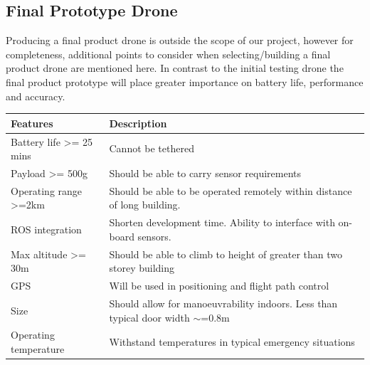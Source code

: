 \documentclass[capstone_report.tex]{subfiles}
\begin{document}
\subsection{Final Prototype Drone}
Producing a final product drone is outside the scope of our project, however for completeness, additional points to consider when selecting/building a final product drone are mentioned here.  In contrast to the initial testing drone the final product prototype will place greater importance on battery life, performance and accuracy.

\begin{table}[H]
\centering
\label{final_requirements}
\begin{tabular}{p{6cm}p{8cm}}
\toprule
Features                           & Description                                                                         \\ \midrule
Battery life \textgreater= 25 mins & Cannot be tethered                                                                  \\
Payload \textgreater= 500g         & Should be able to carry sensor requirements                                         \\
Operating range \textgreater=2km   & Should be able to be operated remotely within distance of long building.            \\
ROS integration                    & Shorten development time.  Ability to interface with on-board sensors.              \\
Max altitude \textgreater= 30m     & Should be able to climb to height of greater than two storey building               \\
GPS                                & Will be used in positioning and flight path control                                 \\
Size                               & Should allow for manoeuvrability indoors.  Less than typical door width $\sim$=0.8m \\
Operating temperature              & Withstand temperatures in typical emergency situations                              \\ \bottomrule
\end{tabular}
\end{table}
\end{document}
